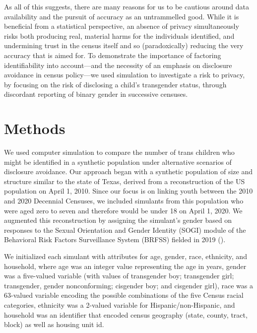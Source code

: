 \documentclass{jpc} %
\theoremstyle{plain}\newtheorem{satz}[thm]{Satz} %
\begin{document}
As all of this suggests, there are many reasons for us to be cautious around data availability and the pursuit of accuracy as an untrammelled good. While it is beneficial from a statistical perspective, an absence of privacy simultaneously risks both producing real, material harms for the individuals identified, and undermining trust in the census itself and so (paradoxically) reducing the very accuracy that is aimed for. To demonstrate the importance of factoring identifiability into account---and the necessity of an emphasis on disclosure avoidance in census policy---we used simulation to investigate a risk to privacy, by focusing on the risk of disclosing a child's transgender status, through discordant reporting of binary gender in successive censuses.

\section*{Methods}

We used computer simulation to compare the number of trans children who might be identified in a synthetic population under alternative scenarios of disclosure avoidance.  Our approach began with a synthetic population of size and structure similar to the state of Texas, derived from a reconstruction of the US population on April 1, 2010.  Since our focus is on linking youth between the 2010 and 2020 Decennial Censuses, we included simulants from this population who were aged zero to seven and therefore would be under 18 on April 1, 2020.  We augmented this reconstruction by assigning the simulant's gender based on responses to the Sexual Orientation and Gender Identity (SOGI) module of the Behavioral Risk Factors Surveillance System (BRFSS) fielded in 2019 (\cite{brfss2019}). %

We initialized each simulant with attributes for age, gender, race, ethnicity, and household, where age was an integer value representing the age in years, gender was a five-valued variable (with values of transgender boy; transgender girl; transgender, gender nonconforming; cisgender boy; and cisgender girl), race was a 63-valued variable encoding the possible combinations of the five Census racial categories, ethnicity was a 2-valued variable for Hispanic/non-Hispanic, and household was an identifier that encoded census geography (state, county, tract, block) as well as housing unit id.
\end{document}
